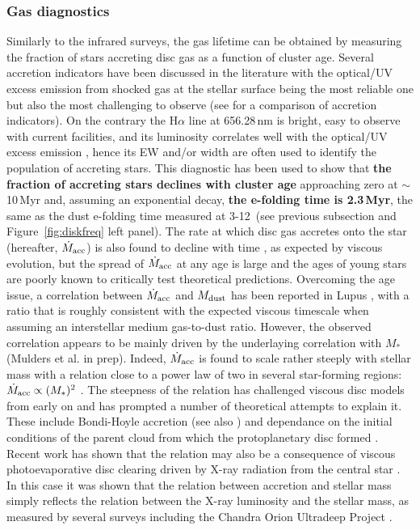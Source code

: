 \documentclass{rsos}
\begin{document}
\subsubsection{Gas diagnostics}\label{sect:gas}
Similarly to the infrared surveys, the gas lifetime can be obtained by measuring the fraction of stars accreting disc gas as a function of cluster age.
Several accretion indicators have been discussed in the literature with the optical/UV excess emission from shocked gas at the stellar surface being the most reliable one but also the most challenging to observe (see \cite{2012A&A...548A..56R} for a comparison of accretion indicators). 
On the contrary the H$\alpha$ line at 656.28\,nm is bright, easy to observe with current facilities, and its luminosity correlates well with the optical/UV excess emission 
\cite{2014A&A...561A...2A}, hence its EW and/or width are often used to identify the population of accreting stars. This diagnostic has been used to show that {\bf the fraction of accreting stars declines with cluster age} approaching zero at $\sim$10\,Myr and, assuming an exponential decay, {\bf the e-folding time is 2.3\,Myr}, the same as the dust e-folding time measured at 3-12\,\micron{} \cite{2010A&A...510A..72F} (see previous subsection and Figure~\ref{fig:diskfreq} left panel). The rate at which disc gas accretes onto the star (hereafter, $\dot{M}_{\rm acc}$) is also found to decline with time 
\cite{2010ApJ...710..597S,2010pdac.book..263P}, as expected by viscous evolution, but the spread of  $\dot{M}_{\rm acc}$ at any age is large and the ages of young  stars are poorly known to critically test theoretical predictions.
Overcoming the age issue, a correlation between  $\dot{M}_{\rm acc}$ and $M_{\rm dust}$ has been reported in Lupus \cite{2016A&A...591L...3M}, with a ratio that is roughly consistent with the expected viscous timescale when assuming an interstellar medium gas-to-dust ratio. However, the observed correlation appears to be mainly driven by the underlaying correlation with $M_*$ (Mulders et al. in prep). Indeed, $\dot{M}_{\rm acc}$ is found to scale rather steeply with stellar mass  with a relation close to a power law of two in several star-forming regions: $\dot{M}_{\rm acc} \propto (M_*)^2$ 
\cite{2008ApJ...681..594H,2012A&A...548A..56R,2014A&A...561A...2A,2016A&A...585A.136M}. The steepness of the relation has challenged viscous disc models from early on 
\cite{2006ApJ...648..484H} and has prompted a number of theoretical attempts to explain it. These include Bondi-Hoyle accretion \cite{2005ApJ...622L..61P} (see also \cite{2008AJ....135.2380T}) and dependance on the initial conditions of the parent cloud from which the protoplanetary disc formed \cite{2006ApJ...645L..69D, 2006ApJ...639L..83A}. Recent work has shown that the relation may also  be a consequence of viscous photoevaporative disc clearing driven by X-ray radiation from the central star \cite{2014MNRAS.439..256E}. In this case it was shown that the relation between accretion and stellar mass simply reflects the relation between the X-ray luminosity and the stellar mass, as measured by several surveys including the Chandra Orion Ultradeep Project \cite{2005ApJS..160..401P}. 
\end{document}
